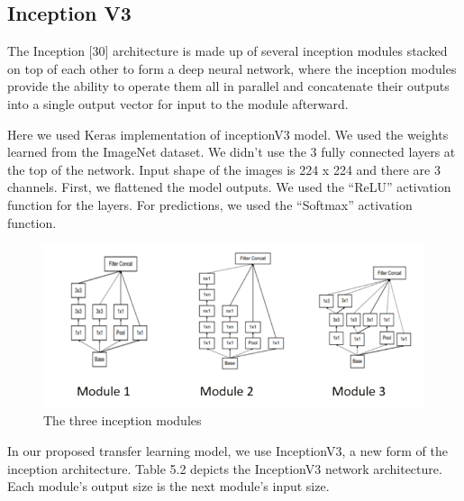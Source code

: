 \subsection{Inception V3}
The Inception [30] architecture is made up of several inception modules stacked on top of each other to form a deep neural network, where the inception modules provide the ability to operate them all in parallel and concatenate their outputs into a single output vector for input to the module afterward. 

\vspace{5mm}
\noindent Here we used Keras implementation of inceptionV3 model. We used the weights learned from the ImageNet dataset. We didn’t use the 3 fully connected layers at the top of the network. Input shape of the images is 224 x 224 and there are 3 channels. First, we flattened the model outputs. We used the “ReLU” activation function for the layers. For predictions, we used the “Softmax” activation function.

\vspace{5mm}
\begin{figure}[hbt!]
\centering
\includegraphics[scale=0.5]{images/fig-10.png}
\caption{The three inception modules}
\label{fig:x The three inception modules}
\end{figure}

\vspace{5mm}
\noindent In our proposed transfer learning model, we use InceptionV3, a new form of the inception architecture. Table 5.2 depicts the InceptionV3 network architecture. Each module's output size is the next module's input size. 

